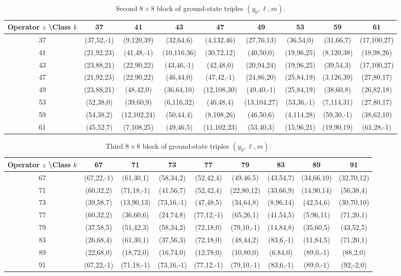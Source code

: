 \documentclass[11pt,a4paper]{article}
\begin{document}
\begin{table}[htbp]
\centering
\tiny
\begin{tabular}{c|cccccccc}
Operator \(z\) \textbackslash Class \(k\) & 37 & 41 & 43 & 47 & 49 & 53 & 59 & 61 \\
\hline
37 & (37,52,-1) & (9,120,39) & (32,64,6) & (4,132,46) & (27,76,13) & (36,54,0) & (31,66,7) & (17,100,27) \\
41 & (21,92,23) & (41,48,-1) & (10,116,36) & (30,72,12) & (40,50,0) & (19,96,25) & (8,120,38) & (18,98,26) \\
43 & (23,88,21) & (22,90,22) & (43,46,-1) & (42,48,0) & (20,94,24) & (19,96,25) & (39,54,3) & (17,100,27) \\
47 & (21,92,23) & (22,90,22) & (46,44,0) & (47,42,-1) & (24,86,20) & (25,84,19) & (3,126,39) & (27,80,17) \\
49 & (23,88,21) & (48,42,0) & (36,64,10) & (12,108,30) & (49,40,-1) & (25,84,19) & (38,60,8) & (26,82,18) \\
53 & (52,38,0) & (39,60,9) & (6,116,32) & (46,48,4) & (13,104,27) & (53,36,-1) & (7,114,31) & (27,80,17) \\
59 & (54,38,2) & (12,102,24) & (50,44,4) & (8,108,26) & (46,50,6) & (4,114,28) & (59,30,-1) & (38,62,10) \\
61 & (45,52,7) & (7,108,25) & (49,46,5) & (11,102,23) & (53,40,3) & (15,96,21) & (19,90,19) & (61,28,-1) \\
\end{tabular}
\caption{Second \(8 \times 8\) block of ground-state triples \((y_0, \ell, m)\).}
\label{tab:ym-block2}
\end{table}

\begin{table}[htbp]
\centering
\tiny
\begin{tabular}{c|cccccccc}
Operator \(z\) \textbackslash Class \(k\) & 67 & 71 & 73 & 77 & 79 & 83 & 89 & 91 \\
\hline
67 & (67,22,-1) & (61,30,1) & (58,34,2) & (52,42,4) & (49,46,5) & (43,54,7) & (34,66,10) & (32,70,12) \\
71 & (60,32,2) & (71,18,-1) & (41,56,7) & (52,42,4) & (22,80,12) & (33,66,9) & (14,90,14) & (56,38,4) \\
73 & (39,58,7) & (13,90,13) & (73,16,-1) & (47,48,5) & (34,64,8) & (8,96,14) & (42,54,6) & (30,70,10) \\
77 & (60,32,2) & (36,60,6) & (24,74,8) & (77,12,-1) & (65,26,1) & (41,54,5) & (5,96,11) & (71,20,1) \\
79 & (37,58,5) & (51,42,3) & (58,34,2) & (72,18,0) & (79,10,-1) & (14,84,8) & (35,60,5) & (43,52,5) \\
83 & (26,68,4) & (61,30,1) & (37,56,3) & (72,18,0) & (48,44,2) & (83,6,-1) & (11,84,5) & (71,20,1) \\
89 & (22,68,0) & (18,72,0) & (16,74,0) & (12,78,0) & (10,80,0) & (6,84,0) & (89,0,-1) & (88,2,0) \\
91 & (67,22,-1) & (71,18,-1) & (73,16,-1) & (77,12,-1) & (79,10,-1) & (83,6,-1) & (89,0,-1) & (92,-2,0) \\
\end{tabular}
\caption{Third \(8 \times 8\) block of ground-state triples \((y_0, \ell, m)\).}
\label{tab:ym-block3}
\end{table}
\end{document}
